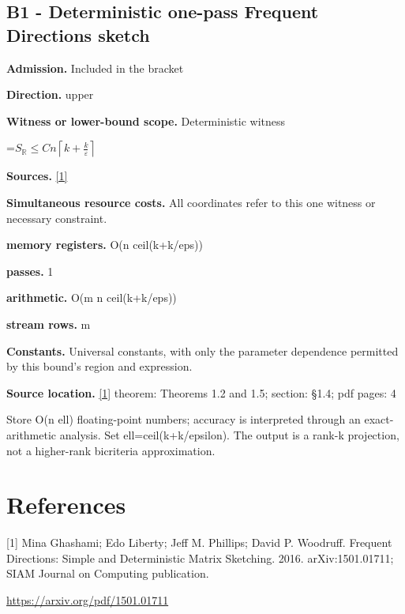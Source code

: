 \documentclass[10pt,a4paper]{article}
\newcommand{\AtlasMath}[1]{\par\begingroup\centering\setbox0=\hbox{$\displaystyle #1$}\ifdim\wd0>1.4\linewidth\typeout{ATLAS WIDE FORMULA: \the\wd0}\fi\ifdim\wd0>\linewidth\resizebox{\linewidth}{!}{\box0}\else\box0\fi\par\endgroup}
\begin{document}
\subsection{B1 - Deterministic one-pass Frequent Directions sketch}
\textbf{Admission.} Included in the bracket

\textbf{Direction.} upper

\textbf{Witness or lower-bound scope.} Deterministic witness

\AtlasMath{S_{\mathbb{R}}\le Cn\left\lceil k+\frac{k}{\varepsilon}\right\rceil}
\textbf{Sources.} \href{https://arxiv.org/pdf/1501.01711}{[1]}

\textbf{Simultaneous resource costs.} All coordinates refer to this one witness or necessary constraint.

\textbf{memory registers.} O(n ceil(k+k/eps))

\textbf{passes.} 1

\textbf{arithmetic.} O(m n ceil(k+k/eps))

\textbf{stream rows.} m

\textbf{Constants.} Universal constants, with only the parameter dependence permitted by this bound’s region and expression.

\textbf{Source location.} \href{https://arxiv.org/pdf/1501.01711}{[1]} theorem: Theorems 1.2 and 1.5; section: §1.4; pdf pages: 4

Store O(n ell) floating-point numbers; accuracy is interpreted through an exact-arithmetic analysis. Set ell=ceil(k+k/epsilon). The output is a rank-k projection, not a higher-rank bicriteria approximation.

\section{References}
[1] Mina Ghashami; Edo Liberty; Jeff M. Phillips; David P. Woodruff. Frequent Directions: Simple and Deterministic Matrix Sketching. 2016. arXiv:1501.01711; SIAM Journal on Computing publication.

\url{https://arxiv.org/pdf/1501.01711}
\end{document}
